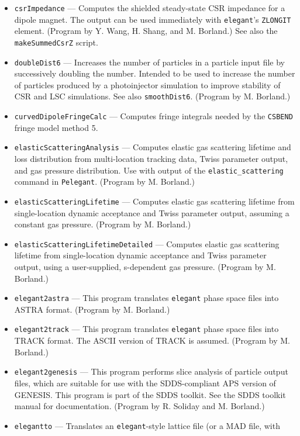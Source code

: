 \documentclass[11pt]{article}
\begin{document}
\begin{itemize}
  (Program by X. Dong.)
\item {\tt csrImpedance} --- Computes the shielded steady-state CSR impedance for a dipole magnet.
 The output can be used immediately with {\tt elegant}'s \verb|ZLONGIT| element.
 (Program by Y. Wang, H. Shang, and M. Borland.)
 See also the {\tt makeSummedCsrZ} script.
\item {\tt doubleDist6} --- Increases the number of particles in a particle input file by
 successively doubling the number.  Intended to be used to increase the number of particles
 produced by a photoinjector simulation to improve stability of CSR and LSC simulations.
 See also {\tt smoothDist6}.
  (Program by M. Borland.)
\item {\tt curvedDipoleFringeCalc} --- Computes fringe integrals needed by the \verb|CSBEND| fringe
  model method 5. 
\item {\tt elasticScatteringAnalysis} --- Computes elastic gas scattering lifetime and loss distribution from
  multi-location tracking data, Twiss parameter output, and gas pressure distribution. Use with output of the
  \verb|elastic_scattering| command in \verb|Pelegant|.
  (Program by M. Borland.)
\item {\tt elasticScatteringLifetime} --- Computes elastic gas scattering lifetime from single-location 
  dynamic acceptance and Twiss parameter output, assuming a constant gas pressure.
  (Program by M. Borland.)
\item {\tt elasticScatteringLifetimeDetailed} --- Computes elastic gas scattering lifetime from single-location 
  dynamic acceptance and Twiss parameter output, using a user-supplied, s-dependent gas pressure.
  (Program by M. Borland.)
\item {\tt elegant2astra} --- This program translates {\tt elegant} phase space files into ASTRA \cite{ASTRA} format.
  (Program by M. Borland.)
\item {\tt elegant2track} --- This program translates {\tt elegant} phase space files into TRACK \cite{TRACK} format.
  The ASCII version of TRACK is assumed.
  (Program by M. Borland.)
\item {\tt elegant2genesis} --- This program performs
        slice analysis of particle output files, which are suitable for use with
        the SDDS-compliant APS version of GENESIS\cite{GENESIS}.  This program is
        part of the SDDS toolkit.  See the SDDS toolkit
        manual for documentation. (Program by R. Soliday and M. Borland.)
\item {\tt elegantto} --- Translates an {\tt elegant}-style lattice file (or a MAD file, with

\end{itemize}
\end{document}
